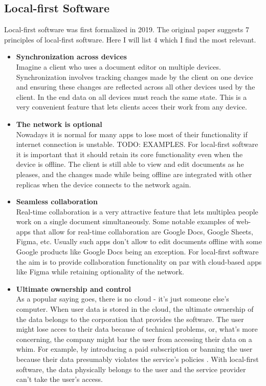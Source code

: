 \documentclass[a4paper, 11pt, oneside]{article}
\theoremstyle{definition}
\begin{document}
\subsection{Local-first Software}
Local-first software was first formalized in 2019. The original paper \cite{localfirst} suggests 7 principles of local-first software. Here I will list 4 which I find the most relevant.
\begin{itemize}
    \item \textbf{Synchronization across devices} \\
    Imagine a client who uses a document editor on multiple devices. Synchronization involves tracking changes made by the client on one device and ensuring these changes are reflected across all other devices used by the client. In the end data on all devices must reach the same state. This is a very convenient feature that lets clients acces their work from any device.

    \item \textbf{The network is optional} \\
    Nowadays it is normal for many apps to lose most of their functionality if internet connection is unstable. TODO: EXAMPLES. For local-first software it is important that it should retain its core functionality even when the device is offline. The client is still able to view and edit documents as he pleases, and the changes made while being offline are integrated with other replicas when the device connects to the network again.

    \item \textbf{Seamless collaboration} \\
    Real-time collaboration is a very attractive feature that lets multiplea people work on a single document simultaneously. Some notable examples of web-apps that allow for real-time collaboration are Google Docs, Google Sheets, Figma, etc. Usually such apps don't allow to edit documents offline with some Google products like Google Docs being an exception. For local-first software the aim is to provide collaboration functionality on par with cloud-based apps like Figma while retaining optionality of the network.

    \item \textbf{Ultimate ownership and control} \\
    As a popular saying goes, there is no cloud - it's just someone else's computer. When user data is stored in the cloud, the ultimate ownership of the data belongs to the corporation that provides the software. The user might lose acces to their data because of technical problems, or, what's more concerning, the company might bar the user from accessing their data on a whim. For example, by introducing a paid subscription or banning the user because their data presumably violates the service's policies \cite{googleblock}. With local-first software, the data physically belongs to the user and the service provider can't take the user's access.
\end{itemize}
\end{document}
